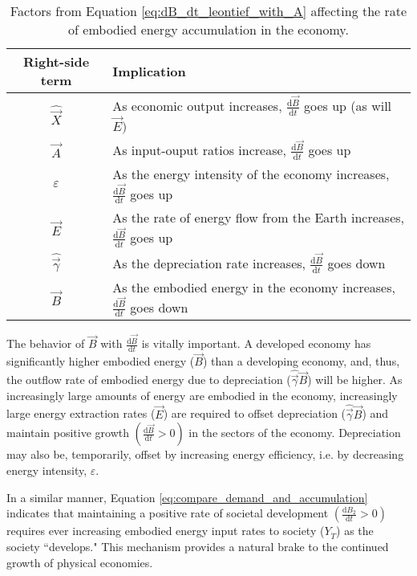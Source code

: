 \begin{table}
\caption{Factors from Equation \ref{eq:dB_dt_leontief_with_A} affecting the rate of embodied energy accumulation in the economy.}
\begin{center}
  \begin{tabular}{| c | l | }
    \hline
    Right-side term & Implication \\ \hline
    $\hat{\vec{X}}$ & As economic output increases, $\frac{\mathrm{d}\vec{B}}{\mathrm{d}t}$ goes up (as will $\vec{E})$  \\ \hline
    $\vec{A}$ & As input-ouput ratios increase, $\frac{\mathrm{d}\vec{B}}{\mathrm{d}t}$ goes up  \\ \hline
    $\varepsilon$ & As the energy intensity of the economy increases, $\frac{\mathrm{d}\vec{B}}{\mathrm{d}t}$ goes up  \\ \hline
   $ \vec{E}$ & As the rate of energy flow from the Earth increases, $\frac{\mathrm{d}\vec{B}}{\mathrm{d}t}$ goes up  \\ \hline
    $\hat{\vec{\gamma}}$ & As the depreciation rate increases, $\frac{\mathrm{d}\vec{B}}{\mathrm{d}t}$ goes down  \\ \hline
    $\vec{B}$ & As the embodied energy in the economy increases, $\frac{\mathrm{d}\vec{B}}{\mathrm{d}t}$ goes down  \\ \hline
  \end{tabular}
\end{center}
\label{table:embodied_energy_accumulation_factors}
\end{table}


The behavior of $\vec{B}$ with $\frac{\mathrm{d}\vec{B}}{\mathrm{d}t}$ is vitally important. A developed economy has significantly higher embodied energy ($\vec{B}$) than a developing economy, and, thus, the outflow rate of embodied energy due to depreciation ($\hat{\vec{\gamma}}\vec{B}$) will be higher. As increasingly large amounts of energy are embodied in the economy, increasingly large energy extraction rates ($\vec{E}$) are required to offset depreciation ($\hat{\vec{\gamma}}\vec{B}$) and maintain positive growth $\left(\frac{\mathrm{d}\vec{B}}{\mathrm{d}t} > 0\right)$ in the sectors of the economy. Depreciation may also be, temporarily, offset by increasing energy efficiency, i.e. by decreasing energy intensity, $\varepsilon$.

In a similar manner, Equation \ref{eq:compare_demand_and_accumulation} indicates that maintaining a positive rate of societal development $\left(\frac{\mathrm{d}B_{2}}{\mathrm{d}t} > 0\right)$ requires ever increasing embodied energy input rates to society ($Y_{\dot{T}}$) as the society ``develops." This mechanism provides a natural brake to the continued growth of physical economies.


